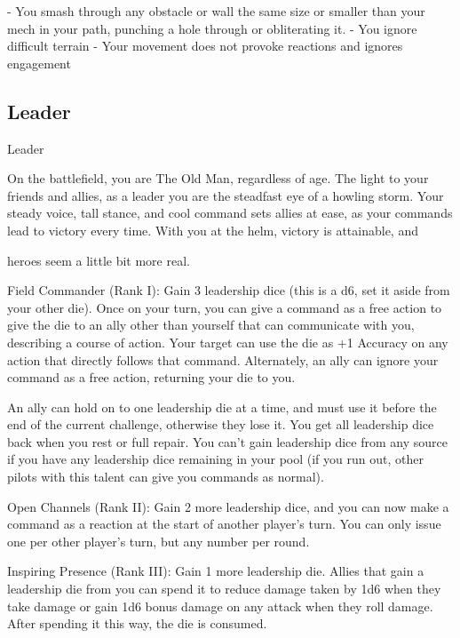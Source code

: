              -    You smash through any obstacle or wall the same size or smaller than your mech  
                  in your path, punching a hole through or obliterating it.  
             -    You ignore difficult terrain  
             -    Your movement does not provoke reactions and ignores engagement  
\subsection{Leader}

                                                    Leader  

On the battlefield, you are The Old Man, regardless of age. The light to your friends and allies, as a leader  
you are the steadfast eye of a howling storm. Your steady voice, tall stance, and cool command sets allies  
at ease, as your commands lead to victory every time. With you at the helm, victory is attainable, and  

heroes seem a little bit more real.   

                                                                                                                


Field Commander (Rank I): Gain 3 leadership dice (this is a d6, set it aside from your other die).  
Once on your turn, you can give a command as a free action to give the die to an ally other than  
yourself that can communicate with you, describing a course of action. Your target can use the  
die as +1 Accuracy on any action that directly follows that command. Alternately, an ally can  
ignore your command as a free action, returning your die to you. 
 
An ally can hold on to one leadership die at a time, and must use it before the end of the current  
challenge, otherwise they lose it. You get all leadership dice back when you rest or full repair. You  
can’t gain leadership dice from any source if you have any leadership dice remaining in your pool  
(if you run out, other pilots with this talent can give you commands as normal).
 
Open Channels (Rank II): Gain 2 more leadership dice, and you can now make a command as a  
reaction at the start of another player’s turn. You can only issue one per other player’s turn, but  
any number per round.
 
Inspiring Presence (Rank III): Gain 1 more leadership die. Allies that gain a leadership die from  
you can spend it to reduce damage taken by 1d6 when they take damage or gain 1d6 bonus  
damage on any attack when they roll damage. After spending it this way, the die is consumed.
 
